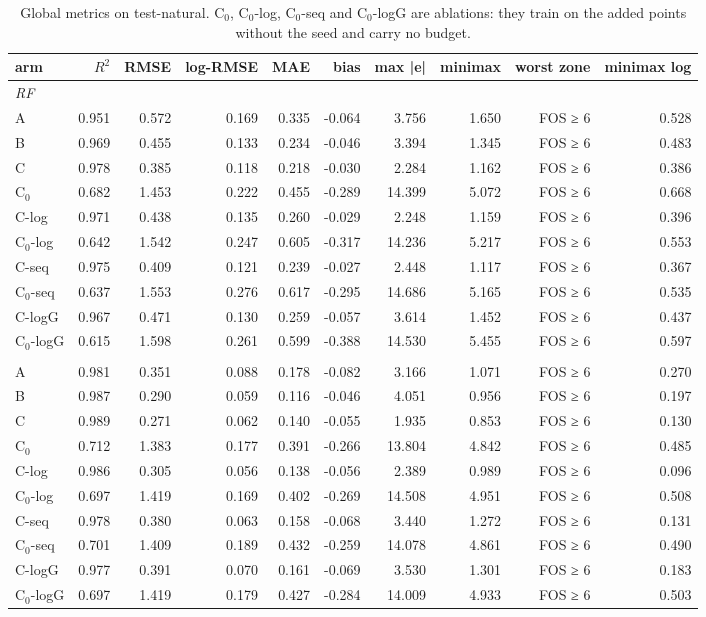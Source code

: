 \begin{table}[htbp]
\centering
\small
\setlength{\tabcolsep}{4pt}
\caption{Global metrics on test-natural. C$_0$, C$_0$-log, C$_0$-seq and C$_0$-logG are ablations: they train on the added points without the seed and carry no budget.}
\label{tab:test-natural__log-rmse:global}
\begin{tabular}{lrrrrrrrrr}
\toprule
arm & $R^2$ & RMSE & log-RMSE & MAE & bias & max |e| & minimax & worst zone & minimax log \\
\midrule
\multicolumn{10}{l}{\textit{RF}} \\
A & 0.951 & 0.572 & 0.169 & 0.335 & -0.064 & 3.756 & 1.650 & FOS ≥ 6 & 0.528 \\
B & 0.969 & 0.455 & 0.133 & 0.234 & -0.046 & 3.394 & 1.345 & FOS ≥ 6 & 0.483 \\
C & 0.978 & 0.385 & 0.118 & 0.218 & -0.030 & 2.284 & 1.162 & FOS ≥ 6 & 0.386 \\
C$_0$ & 0.682 & 1.453 & 0.222 & 0.455 & -0.289 & 14.399 & 5.072 & FOS ≥ 6 & 0.668 \\
C-log & 0.971 & 0.438 & 0.135 & 0.260 & -0.029 & 2.248 & 1.159 & FOS ≥ 6 & 0.396 \\
C$_0$-log & 0.642 & 1.542 & 0.247 & 0.605 & -0.317 & 14.236 & 5.217 & FOS ≥ 6 & 0.553 \\
C-seq & 0.975 & 0.409 & 0.121 & 0.239 & -0.027 & 2.448 & 1.117 & FOS ≥ 6 & 0.367 \\
C$_0$-seq & 0.637 & 1.553 & 0.276 & 0.617 & -0.295 & 14.686 & 5.165 & FOS ≥ 6 & 0.535 \\
C-logG & 0.967 & 0.471 & 0.130 & 0.259 & -0.057 & 3.614 & 1.452 & FOS ≥ 6 & 0.437 \\
C$_0$-logG & 0.615 & 1.598 & 0.261 & 0.599 & -0.388 & 14.530 & 5.455 & FOS ≥ 6 & 0.597 \\
\addlinespace
\multicolumn{10}{l}{\textit{GBM}} \\
A & 0.981 & 0.351 & 0.088 & 0.178 & -0.082 & 3.166 & 1.071 & FOS ≥ 6 & 0.270 \\
B & 0.987 & 0.290 & 0.059 & 0.116 & -0.046 & 4.051 & 0.956 & FOS ≥ 6 & 0.197 \\
C & 0.989 & 0.271 & 0.062 & 0.140 & -0.055 & 1.935 & 0.853 & FOS ≥ 6 & 0.130 \\
C$_0$ & 0.712 & 1.383 & 0.177 & 0.391 & -0.266 & 13.804 & 4.842 & FOS ≥ 6 & 0.485 \\
C-log & 0.986 & 0.305 & 0.056 & 0.138 & -0.056 & 2.389 & 0.989 & FOS ≥ 6 & 0.096 \\
C$_0$-log & 0.697 & 1.419 & 0.169 & 0.402 & -0.269 & 14.508 & 4.951 & FOS ≥ 6 & 0.508 \\
C-seq & 0.978 & 0.380 & 0.063 & 0.158 & -0.068 & 3.440 & 1.272 & FOS ≥ 6 & 0.131 \\
C$_0$-seq & 0.701 & 1.409 & 0.189 & 0.432 & -0.259 & 14.078 & 4.861 & FOS ≥ 6 & 0.490 \\
C-logG & 0.977 & 0.391 & 0.070 & 0.161 & -0.069 & 3.530 & 1.301 & FOS ≥ 6 & 0.183 \\
C$_0$-logG & 0.697 & 1.419 & 0.179 & 0.427 & -0.284 & 14.009 & 4.933 & FOS ≥ 6 & 0.503 \\
\bottomrule
\end{tabular}
\end{table}
